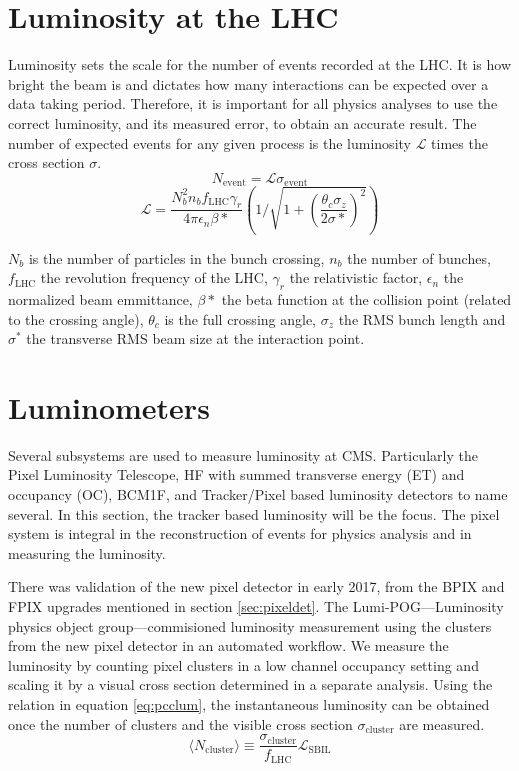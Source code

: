 \section{Luminosity at the LHC}
Luminosity sets the scale for the number of events recorded at the LHC. It is how bright the beam is and dictates how many interactions can be expected over a data taking period. Therefore, it is important for all physics analyses to use the correct luminosity, and its measured error, to obtain an accurate result. The number of expected events for any given process is the luminosity $\mathcal{L}$ times the cross section $\sigma$.  
\begin{equation}
N_{\text{event}} = \mathcal{L} \sigma_{\text{event}}
\end{equation}
\begin{equation}
\mathcal{L} = \frac{N_b^2 n_b f_\text{LHC} \gamma_r}{4\pi\epsilon_n \beta*}\left( 1 / \sqrt{1+ (\frac{\theta_c \sigma_z}{2\sigma*})^2} \right)
\end{equation}

$N_b$ is the number of particles in the bunch crossing, $n_b$ the number of bunches, $f_{\text{LHC}}$ the revolution frequency of the LHC, $\gamma_r$ the relativistic factor, $\epsilon_n$ the normalized beam emmittance, $\beta*$ the beta function at the collision point (related to the crossing angle), $\theta_c$ is the full crossing angle, $\sigma_z$ the RMS bunch length and $\sigma^*$ the transverse RMS beam size at the interaction point.

\section{Luminometers}
Several subsystems are used to measure luminosity at CMS. Particularly the Pixel Luminosity Telescope, HF with summed transverse energy (ET) and occupancy (OC), BCM1F, and Tracker/Pixel based luminosity detectors to name several. 
In this section, the tracker based luminosity will be the focus. The pixel system is integral in the reconstruction of events for physics analysis and in measuring the luminosity.

There was validation of the new pixel detector in early 2017, from the BPIX and FPIX upgrades mentioned in section \ref{sec:pixeldet}. The Lumi-POG---Luminosity physics object group---commisioned luminosity measurement using the clusters from the new pixel detector in an automated workflow. 
We measure the luminosity by counting pixel clusters in a low channel occupancy setting and scaling it by a visual cross section determined in a separate analysis. Using the relation in equation \ref{eq:pcclum}, the instantaneous luminosity can be obtained once the number of clusters and the visible cross section $\sigma_\text{cluster}$ are measured. 
\begin{equation}
\label{eq:pcclum}
\langle N_{\text{cluster}}\rangle\equiv\frac{\sigma_{\text{cluster}}}{f_{\text{LHC}}}\mathcal{L}_{\text{SBIL}}
\end{equation}

